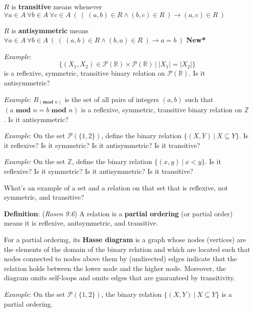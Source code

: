 \documentclass[12pt, oneside]{article}
\begin{document}
$R$ is {\bf transitive} means whenever 
$\forall a \in A~ \forall b \in A~ \forall c \in A~\left( ~\left(~ (a,b) \in R \land (b,c) \in R~\right) \to (a,c) \in R~\right)$

$R$ is {\bf antisymmetric} means $\forall a \in A ~\forall b \in A~\left(~\left( ~(a,b) \in R \land (b,a) \in R ~\right) \to a=b~\right)$
\hfill {\bf *New*}


{\it Example}: 
\[
\{ (X_1, X_2 ) \in\mathcal{P}(\mathbb{R})  \times \mathcal{P}(\mathbb{R}) ~|~ |X_1| = |X_2| \}
\]
 is a reflexive, symmetric, transitive binary relation on $\mathcal{P}(\mathbb{R})$.
Is it antisymmetric?

\vfill

{\it Example}: $R_{(\textbf{mod } n)}$ is the set of all pairs of integers $(a, b)$ such that $(a \textbf{ mod } n = b \textbf{ mod } n)$ 
 is a reflexive, symmetric, transitive binary relation on $\mathbb{Z}$.
Is it antisymmetric?

\vfill

{\it Example}: On the set $\mathcal{P}(\{1,2\})$, define the binary relation 
$\{ (X,Y) ~|~X \subseteq Y \}$. Is it reflexive? Is it symmetric? Is it antisymmetric? Is it transitive?

\vfill

{\it Example}: On the set $\mathbb{Z}$, define the binary relation 
$\{ (x,y) ~|~x < y \}$. Is it reflexive? Is it symmetric? Is it antisymmetric? Is it transitive?

\vfill

What's an example of a set and a relation on that set that is reflexive, not symmetric, and transitive?

\vfill

\newpage
{\bf Definition}: ({\it Rosen 9.6}) A relation is a {\bf partial ordering} (or partial order) means 
it is reflexive, anitsymmetric, and transitive.

For a partial ordering, its {\bf Hasse diagram} is a graph whose nodes (vertices) are the elements of the 
domain of the binary relation and which are located such that nodes connected to nodes
above them by (undirected) edges indicate that the relation holds between the lower node and the higher node. 
Moreover, the diagram omits self-loops and omits edges that are guaranteed by transitivity.


{\it Example}: On the set $\mathcal{P}(\{1,2\})$, the binary relation 
$\{ (X,Y) ~|~X \subseteq Y \}$ is a partial ordering. 

\vfill
\end{document}
